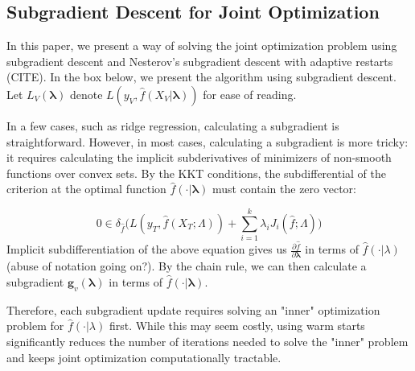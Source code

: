 \documentclass[10pt,letterpaper]{article}
\begin{document}
\subsection{Subgradient Descent for Joint Optimization}

In this paper, we present a way of solving the joint optimization problem using subgradient descent and Nesterov's subgradient descent with adaptive restarts (CITE). In the box below, we present the algorithm using subgradient descent. Let $L_V(\boldsymbol{\lambda})$ denote $L(y_V, \hat f(X_V | \boldsymbol{\lambda}))$ for ease of reading.

\begin{center}
\end{center}

In a few cases, such as ridge regression, calculating a subgradient is straightforward. However, in most cases, calculating a subgradient is more tricky: it requires calculating the implicit subderivatives of minimizers of non-smooth functions over convex sets. By the KKT conditions, the subdifferential of the criterion at the optimal function $\hat f(\cdot | \boldsymbol{\lambda})$ must contain the zero vector:

\begin{equation}
0 \in \delta_{\hat f} \big (L(y_T, \hat f (X_T; \Lambda)) + \sum\limits_{i=1}^k \lambda_i J_i(\hat f; \Lambda) \big)
\end{equation}
Implicit subdifferentiation of the above equation gives us $\frac{\partial \hat f}{\partial \boldsymbol{\lambda}}$ in terms of $\hat f(\cdot | \lambda)$ (abuse of notation going on?). By the chain rule, we can then calculate a subgradient $\boldsymbol{g}_v(\boldsymbol{\lambda})$ in terms of $\hat f(\cdot | \boldsymbol{\lambda})$.

Therefore, each subgradient update requires solving an "inner" optimization problem for $\hat f(\cdot | \lambda)$ first. While this may seem costly, using warm starts significantly reduces the number of iterations needed to solve the "inner" problem and keeps joint optimization computationally tractable.
\end{document}
